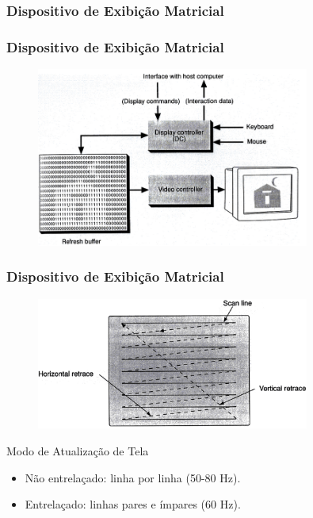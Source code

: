 \documentclass{beamer}
\begin{document}
\subsubsection{Dispositivo de Exibição Matricial}
\begin{frame}
\frametitle{Dispositivo de Exibição Matricial}

	\begin{figure}[!h]
		\begin{center}
			\includegraphics[width=0.8\textwidth]{Figures/matrixDisp}
		\end{center}
		
	\end{figure}

\end{frame}



\begin{frame}
\frametitle{Dispositivo de Exibição Matricial}

	\begin{figure}[!h]
		\begin{center}
			\includegraphics[width=0.8\textwidth]{Figures/matrixcrt}
		\end{center}
	\end{figure}
	
	\begin{block}{Modo de Atualização de Tela}
		\begin{itemize}
			\item Não entrelaçado: linha por linha (50-80 Hz).
			\item Entrelaçado: linhas pares e ímpares (60 Hz).
		\end{itemize}
	\end{block}

\end{frame}
\end{document}

